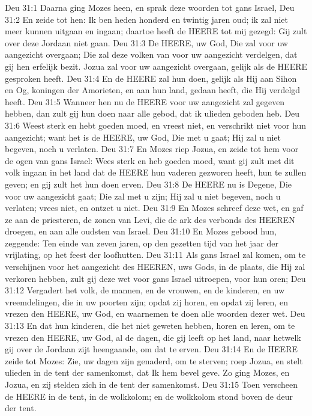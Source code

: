Deu 31:1  Daarna ging Mozes heen, en sprak deze woorden tot gans Israel,
Deu 31:2  En zeide tot hen: Ik ben heden honderd en twintig jaren oud; ik zal niet meer kunnen uitgaan en ingaan; daartoe heeft de HEERE tot mij gezegd: Gij zult over deze Jordaan niet gaan.
Deu 31:3  De HEERE, uw God, Die zal voor uw aangezicht overgaan; Die zal deze volken van voor uw aangezicht verdelgen, dat gij hen erfelijk bezit. Jozua zal voor uw aangezicht overgaan, gelijk als de HEERE gesproken heeft.
Deu 31:4  En de HEERE zal hun doen, gelijk als Hij aan Sihon en Og, koningen der Amorieten, en aan hun land, gedaan heeft, die Hij verdelgd heeft.
Deu 31:5  Wanneer hen nu de HEERE voor uw aangezicht zal gegeven hebben, dan zult gij hun doen naar alle gebod, dat ik ulieden geboden heb.
Deu 31:6  Weest sterk en hebt goeden moed, en vreest niet, en verschrikt niet voor hun aangezicht; want het is de HEERE, uw God, Die met u gaat; Hij zal u niet begeven, noch u verlaten.
Deu 31:7  En Mozes riep Jozua, en zeide tot hem voor de ogen van gans Israel: Wees sterk en heb goeden moed, want gij zult met dit volk ingaan in het land dat de HEERE hun vaderen gezworen heeft, hun te zullen geven; en gij zult het hun doen erven.
Deu 31:8  De HEERE nu is Degene, Die voor uw aangezicht gaat; Die zal met u zijn; Hij zal u niet begeven, noch u verlaten; vrees niet, en ontzet u niet.
Deu 31:9  En Mozes schreef deze wet, en gaf ze aan de priesteren, de zonen van Levi, die de ark des verbonds des HEEREN droegen, en aan alle oudsten van Israel.
Deu 31:10  En Mozes gebood hun, zeggende: Ten einde van zeven jaren, op den gezetten tijd van het jaar der vrijlating, op het feest der loofhutten.
Deu 31:11  Als gans Israel zal komen, om te verschijnen voor het aangezicht des HEEREN, uws Gods, in de plaats, die Hij zal verkoren hebben, zult gij deze wet voor gans Israel uitroepen, voor hun oren;
Deu 31:12  Vergadert het volk, de mannen, en de vrouwen, en de kinderen, en uw vreemdelingen, die in uw poorten zijn; opdat zij horen, en opdat zij leren, en vrezen den HEERE, uw God, en waarnemen te doen alle woorden dezer wet.
Deu 31:13  En dat hun kinderen, die het niet geweten hebben, horen en leren, om te vrezen den HEERE, uw God, al de dagen, die gij leeft op het land, naar hetwelk gij over de Jordaan zijt heengaande, om dat te erven.
Deu 31:14  En de HEERE zeide tot Mozes: Zie, uw dagen zijn genaderd, om te sterven; roep Jozua, en stelt ulieden in de tent der samenkomst, dat Ik hem bevel geve. Zo ging Mozes, en Jozua, en zij stelden zich in de tent der samenkomst.
Deu 31:15  Toen verscheen de HEERE in de tent, in de wolkkolom; en de wolkkolom stond boven de deur der tent.
